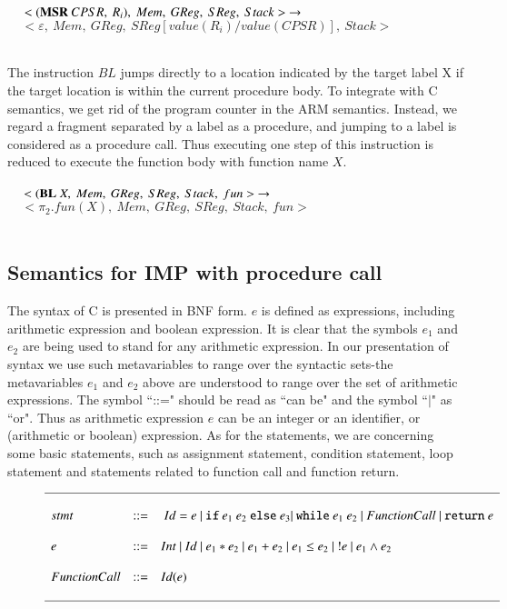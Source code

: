 \documentclass[conference]{IEEEtran}
\begin{document}
$~~~~~<(\textbf{MSR}~CPSR,~R_i),~Mem,~GReg,~SReg,~Stack>~\rightarrow\\ \\$
$~~~~~<\varepsilon,~Mem,~GReg,~SReg[value(R_i)/value(CPSR)],~Stack>$\\ \\
\par The instruction $BL$ jumps directly to a location indicated by the target label X if the target location is within the current procedure body. To integrate with C semantics, we get rid of the program counter in the ARM semantics. Instead, we regard a fragment separated by a label as a procedure, and jumping to a label is considered as a procedure call. Thus executing one step of this instruction is reduced to execute the function body with function name $X$.\\ \\
$~~~~~<(\textbf{BL}~X,~Mem,~GReg,~SReg,~Stack,~fun>~\rightarrow\\ \\$
$~~~~~<\pi_{2}.fun(X),~Mem,~GReg,~SReg,~Stack,~fun>$\\ \\
\subsection{Semantics for IMP with procedure call}

\par  The syntax of C is presented in BNF form. $e$ is defined as expressions, including arithmetic expression and boolean expression. It is clear that the symbols $e_1$ and $e_2$ are being used to stand for any arithmetic expression. In our presentation of syntax we use such metavariables to range over the syntactic sets-the metavariables $e_1$ and $e_2$ above are understood to range over the set of arithmetic expressions.  The symbol ``::=" should be read as ``can be" and the symbol ``$|$" as ``or". Thus as arithmetic expression $e$ can be an integer or an identifier, or (arithmetic or boolean) expression. As for the statements, we are concerning some basic statements, such as assignment statement, condition statement, loop statement and statements related to function call and function return.
\begin{figure*}
\begin{displaymath}
\small
\begin{array}{l l l}
\hline\\
stmt &::=&~Id=e ~|~ \texttt{if}~e_1~e_2~\texttt{else}~e_3 |~ \texttt{while}~e_1~e_2 ~|~ FunctionCall ~|~ \texttt{return}~e \\\\
e &::=&Int~|~Id~|~e_1*e_2~|~e_1+e_2~|~e_1\leq e_2~|~!e~|~e_1\land e_2\\\\
FunctionCall&::=&Id(e)\\\\

\hline

\end{array}
\end{displaymath}
\end{figure*}
\end{document}
